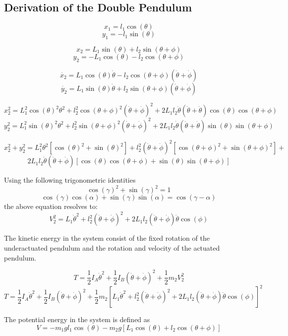 \documentclass[a4paper,12pt]{article}
\begin{document}
	\newpage
	\begin{appendices}
		\section{Derivation of the Double Pendulum}
		$$x_{1}= l_{1}\cos(\theta)$$
		$$y_{1} = -l_{1}\sin(\theta)$$
		
		$$x_{2} = L_{1}\sin(\theta) + l_{2}\sin(\theta + \phi)$$
		$$y_{2} = -L_{1}\cos(\theta) - l_{2}\cos(\theta + \phi)$$
		
		$$\dot{x_{2}} = L_{1}\cos(\theta)\dot{\theta} - l_{2}\cos(\theta+\phi)(\dot{\theta}+\dot{\phi}) $$
		$$\dot{y_{2}} = L_{1}\sin(\theta)\dot{\theta}+l_{2}\sin(\theta+\phi)(\dot{\theta}+\dot{\phi})$$
		
		$$x_{2}^2 = L_{1}^2\cos(\theta)^2\theta^2 +l_{2}^2\cos(\theta+\phi)^2(\dot{\theta}+\dot{\phi})^2 + 2L_{1}l_{2}\dot{\theta}(\dot{\theta}+\dot{\theta})\cos(\theta)\cos(\theta+\phi)$$
		$$y_{2}^2 = L_{1}^2\sin(\theta)^2\theta^2 +l_{2}^2\sin(\theta+\phi)^2(\dot{\theta}+\dot{\phi})^2 + 2L_{1}l_{2}\dot{\theta}(\dot{\theta}+\dot{\theta})\sin(\theta)\sin(\theta+\phi)$$
		
		$$x_{2}^2+y_{2}^2 = L_{1}^2\theta^2[\cos(\theta)^2+\sin(\theta)^2]+l_{2}^2(\dot{\theta}+\dot{\phi})^2[\cos(\theta+\phi)^2+\sin(\theta+\phi)^2] +$$
		$$ 2L_{1}l_{2}\dot{\theta}(\dot{\theta}+\dot{\phi})[\cos(\theta)\cos(\theta+\phi)+\sin(\theta)\sin(\theta+\phi)]$$	
		
		Using the following trigonometric identities $$ \cos(\gamma)^2 + \sin(\gamma)^2 = 1 $$ 
		$$ \cos(\gamma)\cos(\alpha)+\sin(\gamma)\sin(\alpha) = \cos(\gamma - \alpha) $$ the above equation resolves to: $$ V_{2}^2 = L_{1}\dot{\theta}^2+l_{2}^2(\dot{\theta}+\dot{\phi})^2 + 
		2L_{1}l_{2}(\dot{\theta}+\dot{\phi})\dot{\theta}\cos(\phi)$$
		
		The kinetic energy in the system consist of the fixed rotation of the underactuated  pendulum and the rotation and velocity of the actuated pendulum.
		
		$$ T = \frac{1}{2}I_{A}\dot{\theta}^2 + \frac{1}{2}I_{B}(\dot{\theta}+\dot{\phi})^2 + \frac{1}{2}m_{2}V_{2}^2$$
		$$ T = \frac{1}{2}I_{A}\dot{\theta}^2 + \frac{1}{2}I_{B}(\dot{\theta}+\dot{\phi})^2 + \frac{1}{2}m_{2}[L_{1}\dot{\theta}^2+l_{2}^2(\dot{\theta}+\dot{\phi})^2 + 
		2L_{1}l_{2}(\dot{\theta}+\dot{\phi})\dot{\theta}\cos(\phi)]^2$$
		
		The potential energy in the system is defined as
		$$V=-m_{1}gl_{1}\cos(\theta)-m_{2}g[L_{1}\cos(\theta)+l_{2}\cos(\theta+\phi)]$$
		

\end{appendices}
\end{document}
